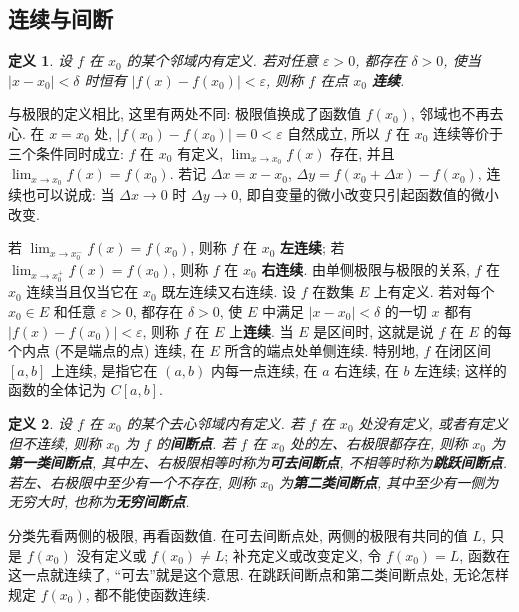 \documentclass[UTF8,openany]{ctexbook}
\theoremstyle{chinesetextbook}
\newtheorem{definition}{定义}[section]
\begin{document}
\subsection{连续与间断}
\begin{definition}
设 $f$ 在 $x_0$ 的某个邻域内有定义. 若对任意 $\varepsilon>0$, 都存在 $\delta>0$, 使当 $|x-x_0|<\delta$ 时恒有 $|f(x)-f(x_0)|<\varepsilon$, 则称 $f$ 在点 $x_0$ \textbf{连续}.
\end{definition}
与极限的定义相比, 这里有两处不同: 极限值换成了函数值 $f(x_0)$, 邻域也不再去心. 在 $x=x_0$ 处, $|f(x_0)-f(x_0)|=0<\varepsilon$ 自然成立, 所以 $f$ 在 $x_0$ 连续等价于三个条件同时成立: $f$ 在 $x_0$ 有定义, $\displaystyle\lim_{x\to x_0}f(x)$ 存在, 并且 $\displaystyle\lim_{x\to x_0}f(x)=f(x_0)$. 若记 $\Delta x=x-x_0$, $\Delta y=f(x_0+\Delta x)-f(x_0)$, 连续也可以说成: 当 $\Delta x\to0$ 时 $\Delta y\to0$, 即自变量的微小改变只引起函数值的微小改变.

若 $\displaystyle\lim_{x\to x_0^-}f(x)=f(x_0)$, 则称 $f$ 在 $x_0$ \textbf{左连续}; 若 $\displaystyle\lim_{x\to x_0^+}f(x)=f(x_0)$, 则称 $f$ 在 $x_0$ \textbf{右连续}. 由单侧极限与极限的关系, $f$ 在 $x_0$ 连续当且仅当它在 $x_0$ 既左连续又右连续. 设 $f$ 在数集 $E$ 上有定义. 若对每个 $x_0\in E$ 和任意 $\varepsilon>0$, 都存在 $\delta>0$, 使 $E$ 中满足 $|x-x_0|<\delta$ 的一切 $x$ 都有 $|f(x)-f(x_0)|<\varepsilon$, 则称 $f$ 在 $E$ 上\textbf{连续}. 当 $E$ 是区间时, 这就是说 $f$ 在 $E$ 的每个内点 (不是端点的点) 连续, 在 $E$ 所含的端点处单侧连续. 特别地, $f$ 在闭区间 $[a,b]$ 上连续, 是指它在 $(a,b)$ 内每一点连续, 在 $a$ 右连续, 在 $b$ 左连续; 这样的函数的全体记为 $C[a,b]$.
\begin{definition}
设 $f$ 在 $x_0$ 的某个去心邻域内有定义. 若 $f$ 在 $x_0$ 处没有定义, 或者有定义但不连续, 则称 $x_0$ 为 $f$ 的\textbf{间断点}. 若 $f$ 在 $x_0$ 处的左、右极限都存在, 则称 $x_0$ 为\textbf{第一类间断点}, 其中左、右极限相等时称为\textbf{可去间断点}, 不相等时称为\textbf{跳跃间断点}. 若左、右极限中至少有一个不存在, 则称 $x_0$ 为\textbf{第二类间断点}, 其中至少有一侧为无穷大时, 也称为\textbf{无穷间断点}.
\end{definition}
分类先看两侧的极限, 再看函数值. 在可去间断点处, 两侧的极限有共同的值 $L$, 只是 $f(x_0)$ 没有定义或 $f(x_0)\ne L$; 补充定义或改变定义, 令 $f(x_0)=L$, 函数在这一点就连续了, “可去”就是这个意思. 在跳跃间断点和第二类间断点处, 无论怎样规定 $f(x_0)$, 都不能使函数连续.
\end{document}
